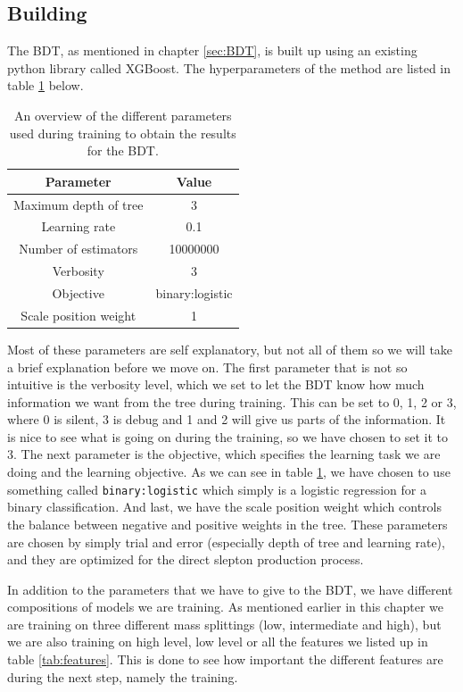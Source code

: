 \subsection{Building}
The BDT, as mentioned in chapter \ref{sec:BDT}, is built up using an existing python library called XGBoost. The hyperparameters of the method are listed in table \ref{tab:parametersBDT} below. 

\begin{table}[H]
    \centering
    \renewcommand{\arraystretch}{1.}
    \begin{tabular}{c c}
    \toprule
    \textbf{Parameter} & \textbf{Value}\\
    \midrule
    \midrule
    Maximum depth of tree & 3\\
    Learning rate     & 0.1 \\
    Number of estimators     & 10000000\\
    Verbosity & 3\\
    Objective & binary:logistic\\
    Scale position weight & 1\\
    \bottomrule
    \end{tabular}
    \caption{An overview of the different parameters used during training to obtain the results for the BDT.}
    \label{tab:parametersBDT}
\end{table}

Most of these parameters are self explanatory, but not all of them so we will take a brief explanation before we move on. The first parameter that is not so intuitive is the verbosity level, which we set to let the BDT know how much information we want from the tree during training. This can be set to 0, 1, 2 or 3, where 0 is silent, 3 is debug and 1 and 2 will give us parts of the information. It is nice to see what is going on during the training, so we have chosen to set it to 3. The next parameter is the objective, which specifies the learning task we are doing and the learning objective. As we can see in table \ref{tab:parametersBDT}, we have chosen to use something called \texttt{binary:logistic} which simply is a logistic regression for a binary classification. And last, we have the scale position weight which controls the balance between negative and positive weights in the tree. These parameters are chosen by simply trial and error (especially depth of tree and learning rate), and they are optimized for the direct slepton production process.

In addition to the parameters that we have to give to the BDT, we have different compositions of models we are training. As mentioned earlier in this chapter we are training on three different mass splittings (low, intermediate and high), but we are also training on high level, low level or all the features we listed up in table \ref{tab:features}. This is done to see how important the different features are during the next step, namely the training.

